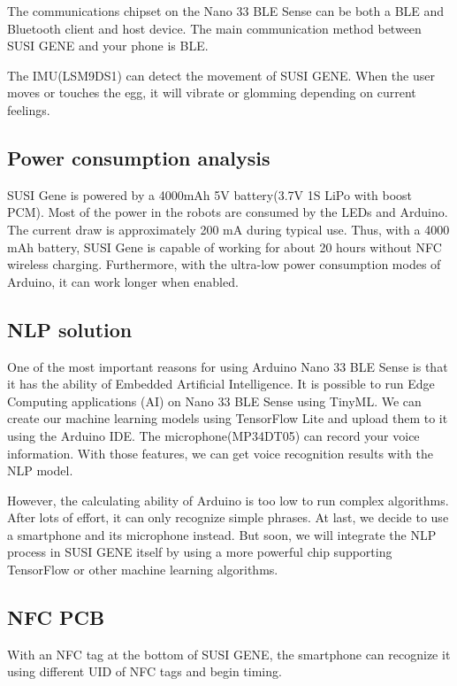 \documentclass[manuscript,screen]{acmart}
\begin{document}
The communications chipset on the Nano 33 BLE Sense can be both a BLE and Bluetooth client and host device. The main communication method between SUSI GENE and your phone is BLE.

The IMU(LSM9DS1) can detect the movement of SUSI GENE. When the user moves or touches the egg, it will vibrate or glomming depending on current feelings.

\subsection{Power consumption analysis}

SUSI Gene is powered by a 4000mAh 5V battery(3.7V 1S LiPo with boost PCM). Most of the power in the robots are consumed by the LEDs and Arduino. The current draw is approximately 200 mA during typical use. Thus, with a 4000 mAh battery, SUSI Gene is capable of working for about 20 hours without NFC wireless charging. Furthermore, with the ultra-low power consumption modes of Arduino, it can work longer when enabled.

\subsection{NLP solution}

One of the most important reasons for using Arduino Nano 33 BLE Sense is that it has the ability of Embedded Artificial Intelligence. It is possible to run Edge Computing applications (AI) on Nano 33 BLE Sense using TinyML. We can create our machine learning models using TensorFlow Lite and upload them to it using the Arduino IDE. The microphone(MP34DT05) can record your voice information. With those features, we can get voice recognition results with the NLP model.

However, the calculating ability of Arduino is too low to run complex algorithms. After lots of effort, it can only recognize simple phrases. At last, we decide to use a smartphone and its microphone instead. But soon, we will integrate the NLP process in SUSI GENE itself by using a more powerful chip supporting TensorFlow or other machine learning algorithms. 

\subsection{NFC PCB}

With an NFC tag at the bottom of SUSI GENE, the smartphone can recognize it using different UID of NFC tags and begin timing.
\end{document}
